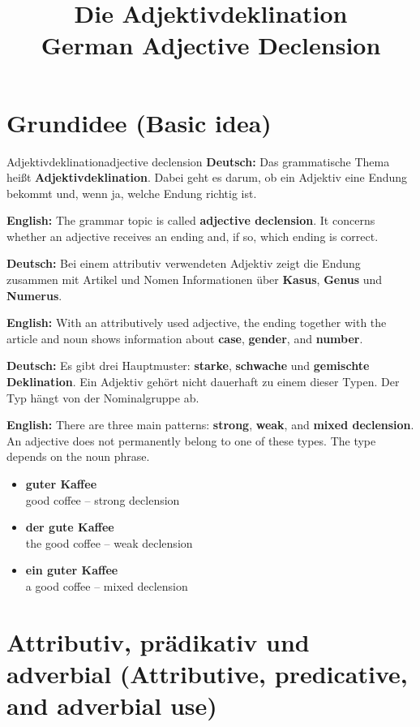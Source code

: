 \documentclass[a4paper,11pt]{article}
\title{Die Adjektivdeklination\\\large German Adjective Declension}
\date{}
\newcommand{\GermanText}[1]{\textbf{Deutsch: }#1\par}
\newcommand{\EnglishText}[1]{{\small\color{SoftGray}\textbf{English: }#1\par}}
\newcommand{\ExampleItem}[2]{\item \textbf{#1}\\{\small\color{SoftGray}#2}}
\begin{document}
\maketitle
\tableofcontents
\newpage

\section{Grundidee \textnormal{(Basic idea)}}

\begin{grammarentry}{Adjektivdeklination}{adjective declension}
\GermanText{Das grammatische Thema heißt \textbf{Adjektivdeklination}. Dabei geht es darum, ob ein Adjektiv eine Endung bekommt und, wenn ja, welche Endung richtig ist.}
\EnglishText{The grammar topic is called \textbf{adjective declension}. It concerns whether an adjective receives an ending and, if so, which ending is correct.}

\GermanText{Bei einem attributiv verwendeten Adjektiv zeigt die Endung zusammen mit Artikel und Nomen Informationen über \textbf{Kasus}, \textbf{Genus} und \textbf{Numerus}.}
\EnglishText{With an attributively used adjective, the ending together with the article and noun shows information about \textbf{case}, \textbf{gender}, and \textbf{number}.}

\GermanText{Es gibt drei Hauptmuster: \textbf{starke}, \textbf{schwache} und \textbf{gemischte Deklination}. Ein Adjektiv gehört nicht dauerhaft zu einem dieser Typen. Der Typ hängt von der Nominalgruppe ab.}
\EnglishText{There are three main patterns: \textbf{strong}, \textbf{weak}, and \textbf{mixed declension}. An adjective does not permanently belong to one of these types. The type depends on the noun phrase.}
\end{grammarentry}

\begin{exbox}
\begin{itemize}
\ExampleItem{guter Kaffee}{good coffee -- strong declension}
\ExampleItem{der gute Kaffee}{the good coffee -- weak declension}
\ExampleItem{ein guter Kaffee}{a good coffee -- mixed declension}
\end{itemize}
\end{exbox}

\section{Attributiv, prädikativ und adverbial \textnormal{(Attributive, predicative, and adverbial use)}}
\end{document}

